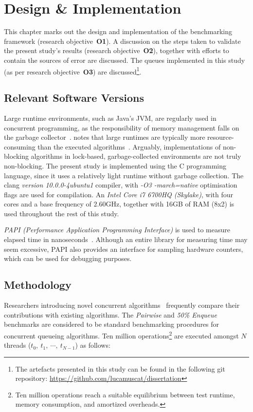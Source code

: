 \chapter{Design \& Implementation\label{chap:design_and_implementation}}
This chapter marks out the design and implementation of the benchmarking
framework (research objective~\textbf{O1}). A discussion on the steps taken to validate the
present study's results (research objective~\textbf{O2}), together
with efforts to contain the sources of error are discussed. The queues implemented in this
study (as per research objective~\textbf{O3}) are discussed\footnote{The
artefacts presented in this study can be found in the following git
repository: \url{https://github.com/lucamuscat/dissertation}}.

\section{Relevant Software Versions}
Large runtime environments, such as Java's JVM, are regularly used in
concurrent programming, as the responsibility of memory management falls on the
garbage collector~\citep{kogan2011wait}. \citeauthor{fog2020optimizing} notes
that large runtimes are typically more resource-consuming than the executed
algorithms~\citep{fog2020optimizing}. Arguably, implementations of non-blocking
algorithms in lock-based, garbage-collected environments are not truly
non-blocking. The present study is implemented using the C programming language, since
it uses a relatively light runtime without garbage collection. The clang
\emph{version 10.0.0-4ubuntu1} compiler, with \emph{\mbox{-O3} -march=native}
optimisation flags are used for compilation. An \emph{Intel Core i7 6700HQ
(Skylake)}, with four cores and a base frequency of $2.60\text{GHz}$, together
with 16GB of RAM (8x2) is used throughout the rest of this study.

\emph{PAPI (Performance Application Programming Interface)} is used to measure
elapsed time in nanoseconds~\citep{terpstra2010papi}. Although an entire library for measuring time 
may seem excessive, PAPI also provides an interface for
sampling hardware counters, which can be used for debugging purposes.

\section{Methodology\label{sec:design_and_implementation_methodology}}

Researchers introducing novel concurrent
algorithms~\citep{michael1996simple,valois1994queues,kogan2011wait,hoffman2007baskets,yang2016wait}
frequently compare their contributions with existing algorithms. The
\emph{Pairwise} and \emph{50\% Enqueue}
benchmarks are considered to be standard benchmarking procedures for concurrent
queueing algorithms. Ten million operations\footnote{Ten million operations
reach a suitable equilibrium between test runtime, memory
consumption, and amortized overheads.} are
executed amongst $N$ threads ($t_0,~t_1,~\cdots,~t_{N-1}$) as follows: 

